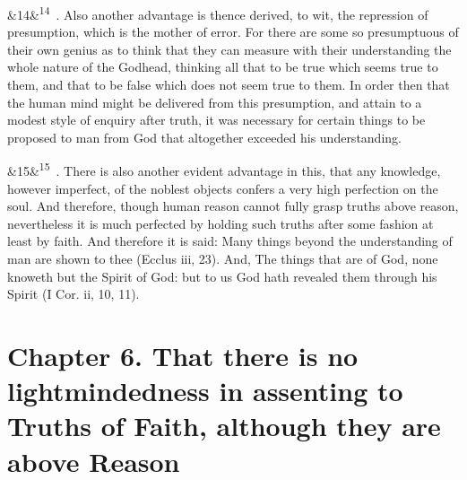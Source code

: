 \documentclass[12pt]{article}
\newcommand{\para}[1][]{\par\noindent\ifx&#1&\else\textsuperscript{\footnotesize #1}~\fi}
\begin{document}
\para[14] 2. Also another advantage is thence derived, to wit, the repression of presumption, which is the mother of error. For there are some so presumptuous of their own genius as to think that they can measure with their understanding the whole nature of the Godhead, thinking all that to be true which seems true to them, and that to be false which does not seem true to them. In order then that the human mind might be delivered from this presumption, and attain to a modest style of enquiry after truth, it was necessary for certain things to be proposed to man from God that altogether exceeded his understanding.

\para[15] 3. There is also another evident advantage in this, that any knowledge, however imperfect, of the noblest objects confers a very high perfection on the soul. And therefore, though human reason cannot fully grasp truths above reason, nevertheless it is much perfected by holding such truths after some fashion at least by faith. And therefore it is said: Many things beyond the understanding of man are shown to thee (Ecclus iii, 23). And, The things that are of God, none knoweth but the Spirit of God: but to us God hath revealed them through his Spirit (I Cor. ii, 10, 11).

\section*{Chapter 6. That there is no lightmindedness in assenting to Truths of Faith, although they are above Reason}
\end{document}
